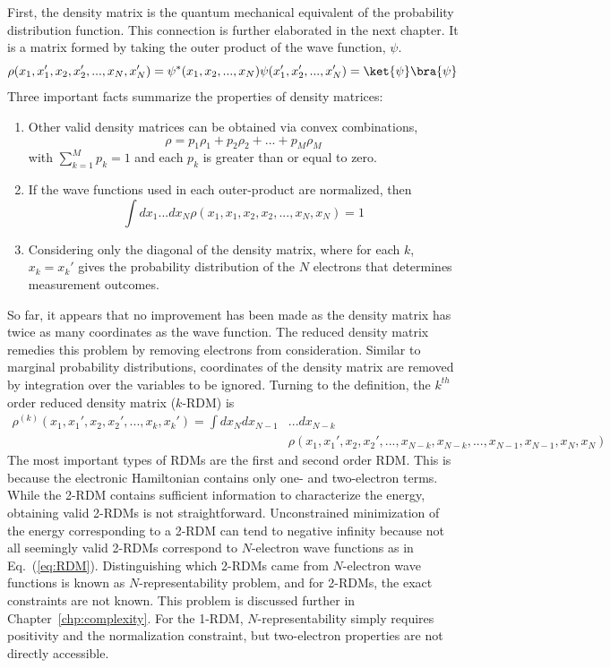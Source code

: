 \documentclass[11pt,oneside,final]{huthesis}%
\begin{document}
First, the density matrix is the quantum mechanical equivalent of the probability distribution function.  This connection is further elaborated in the next chapter.  It is a matrix formed by taking the outer product of the wave function, $\psi$.
\begin{equation}
\rho(x_1,x_1',x_2,x_2',...,x_N,x_N')=\psi^*(x_1,x_2,...,x_N)\psi(x_1',x_2',...,x_N')=\ket{\psi}\bra{\psi}
\end{equation} Three important facts summarize the properties of density matrices: 
\begin{enumerate}
	\item Other valid density matrices can be obtained via convex combinations, $$\rho=p_1\rho_1+p_2\rho_2+...+p_M\rho_M$$ with $\sum_{k=1}^M p_k=1$ and each $p_k$ is greater than or equal to zero. 
	\item If the wave functions used in each outer-product are normalized, then $$\int dx_1 ... dx_N\rho(x_1,x_1,x_2,x_2,...,x_N,x_N)=1$$
	\item Considering only the diagonal of the density matrix, where for each $k$, $x_k=x_k'$ gives the probability distribution of the $N$ electrons that  determines measurement outcomes.
\end{enumerate}

So far, it appears that no improvement has been made as the density matrix has twice as many coordinates as the wave function.    The reduced density matrix remedies this problem by removing electrons from consideration.  Similar to marginal probability distributions, coordinates of the density matrix are removed by integration over the variables to be ignored.  Turning to the definition, the $k^{th}$ order reduced density matrix ($k$-RDM) is
\begin{align}
\rho^{(k)}(x_1,x_1',x_2,x_2',...,x_k,x_k')=\int dx_N dx_{N-1}& ... dx_{N-k}\nonumber\\ &\rho(x_1,x_1',x_2,x_2',...,x_{N-k},x_{N-k},...,x_{N-1},x_{N-1},x_N,x_N)
\label{eq:RDM}
\end{align}
The most important types of RDMs are the first and second order RDM.  This is because the electronic Hamiltonian contains only one- and two-electron terms.  While the 2-RDM contains sufficient information to characterize the energy, obtaining valid 2-RDMs is not straightforward.  Unconstrained minimization of the energy corresponding to a 2-RDM can tend to negative infinity because not all seemingly valid 2-RDMs correspond to $N$-electron wave functions as in Eq.~(\ref{eq:RDM}).  Distinguishing which 2-RDMs came from $N$-electron wave functions is known as $N$-representability problem, and for 2-RDMs, the exact constraints are not known. This problem is discussed further in Chapter~\ref{chp:complexity}. For the 1-RDM, $N$-representability simply requires positivity and the normalization constraint, but two-electron properties are not directly accessible.
\end{document}

